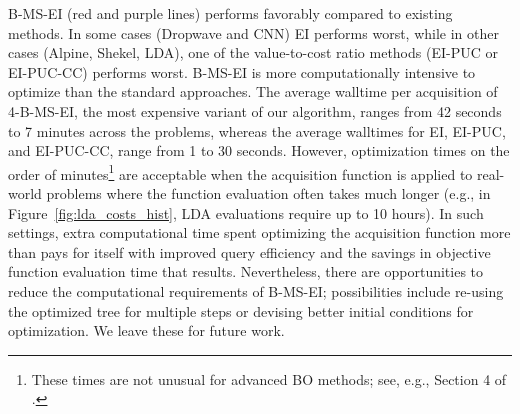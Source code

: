 B-MS-EI (red and purple lines) performs favorably compared to existing methods. In some cases (Dropwave and CNN) EI performs worst, while in other cases (Alpine, Shekel, LDA), one of the value-to-cost ratio methods (EI-PUC or EI-PUC-CC) performs worst.
 B-MS-EI is more computationally intensive to optimize than the standard approaches. The average walltime per acquisition of 4-B-MS-EI, the most expensive variant of our algorithm, ranges from 42 seconds to 7 minutes across the problems, whereas the average walltimes for EI, EI-PUC, and EI-PUC-CC, range from 1 to 30 seconds. However, optimization times on the order of minutes\footnote{These times are not unusual for advanced BO methods; see, e.g., Section 4 of \cite{wu2019practical}.} are acceptable when the acquisition function is applied to real-world problems where the function evaluation often takes much longer (e.g., in Figure~\ref{fig:lda_costs_hist}, LDA evaluations require up to 10 hours). 
In such settings, 
extra computational time spent optimizing the acquisition function more than pays for itself  
with improved query efficiency and the savings in objective function evaluation time that results.
Nevertheless, there are opportunities to reduce the computational requirements of B-MS-EI; possibilities include re-using the optimized tree for multiple steps or devising better initial conditions for optimization. We leave these for future work.








